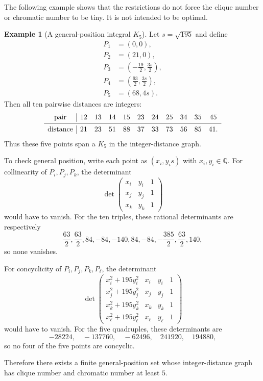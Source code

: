 \documentclass[11pt,a4paper]{amsart}
\theoremstyle{definition}
\newtheorem{example}[theorem]{Example}
\begin{document}
The following example shows that the restrictions do not force the clique number or chromatic number to be tiny.  It is not intended to be optimal.

\begin{example}[A general-position integral $K_5$]\label{ex:K5}
Let $s=\sqrt{195}$ and define
\[
\begin{aligned}
P_1&=(0,0),\\
P_2&=(21,0),\\
P_3&=\left(-\frac{19}{2},\frac{3s}{2}\right),\\
P_4&=\left(\frac{93}{2},\frac{3s}{2}\right),\\
P_5&=(68,4s).
\end{aligned}
\]
Then all ten pairwise distances are integers:
\[
\begin{array}{c|cccccccccc}
\text{pair} & 12&13&14&15&23&24&25&34&35&45\\
\midrule
\text{distance} &21&23&51&88&37&33&73&56&85&41.
\end{array}
\]
Thus these five points span a $K_5$ in the integer-distance graph.

To check general position, write each point as $(x_i,y_i s)$ with $x_i,y_i\in\mathbb Q$.  For collinearity of $P_i,P_j,P_k$, the determinant
\[
        \det\begin{pmatrix}x_i&y_i&1\\x_j&y_j&1\\x_k&y_k&1\end{pmatrix}
\]
would have to vanish.  For the ten triples, these rational determinants are respectively
\[
\frac{63}{2},\frac{63}{2},84,-84,-140,84,-84,-\frac{385}{2},\frac{63}{2},140,
\]
so none vanishes.

For concyclicity of $P_i,P_j,P_k,P_\ell$, the determinant
\[
\det\begin{pmatrix}
 x_i^2+195y_i^2&x_i&y_i&1\\
 x_j^2+195y_j^2&x_j&y_j&1\\
 x_k^2+195y_k^2&x_k&y_k&1\\
 x_\ell^2+195y_\ell^2&x_\ell&y_\ell&1
\end{pmatrix}
\]
would have to vanish.  For the five quadruples, these determinants are
\[
        -28224,\quad -137760,\quad -62496,\quad 241920,\quad 194880,
\]
so no four of the five points are concyclic.

Therefore there exists a finite general-position set whose integer-distance graph has clique number and chromatic number at least $5$.
\end{example}
\end{document}
